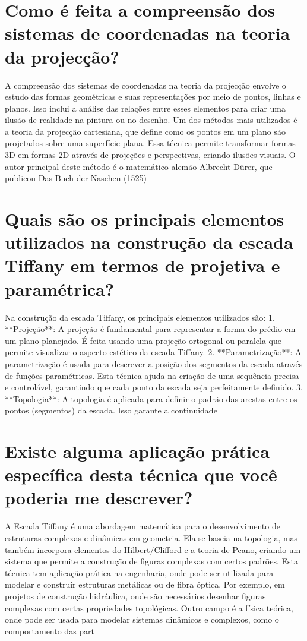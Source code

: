 \documentclass[11pt,a4paper]{article}
\begin{document}
\section{Como é feita a compreensão dos sistemas de coordenadas na teoria da projecção?}
A compreensão dos sistemas de coordenadas na teoria da projecção envolve o estudo das formas geométricas e suas representações por meio de pontos, linhas e planos. Isso inclui a análise das relações entre esses elementos para criar uma ilusão de realidade na pintura ou no desenho. Um dos métodos mais utilizados é a teoria da projecção cartesiana, que define como os pontos em um plano são projetados sobre uma superfície plana. Essa técnica permite transformar formas 3D em formas 2D através de projeções e perspectivas, criando ilusões visuais. O autor principal deste método é o matemático alemão Albrecht Dürer, que publicou Das Buch der Naschen (1525)

\section{Quais são os principais elementos utilizados na construção da escada Tiffany em termos de projetiva e paramétrica?}
Na construção da escada Tiffany, os principais elementos utilizados são: 1. **Projeção**: A projeção é fundamental para representar a forma do prédio em um plano planejado. É feita usando uma projeção ortogonal ou paralela que permite visualizar o aspecto estético da escada Tiffany. 2. **Parametrização**: A parametrização é usada para descrever a posição dos segmentos da escada através de funções paramétricas. Esta técnica ajuda na criação de uma sequência precisa e controlável, garantindo que cada ponto da escada seja perfeitamente definido. 3. **Topologia**: A topologia é aplicada para definir o padrão das arestas entre os pontos (segmentos) da escada. Isso garante a continuidade

\section{Existe alguma aplicação prática específica desta técnica que você poderia me descrever?}
A Escada Tiffany é uma abordagem matemática para o desenvolvimento de estruturas complexas e dinâmicas em geometria. Ela se baseia na topologia, mas também incorpora elementos do Hilbert/Clifford e a teoria de Peano, criando um sistema que permite a construção de figuras complexas com certos padrões. Esta técnica tem aplicação prática na engenharia, onde pode ser utilizada para modelar e construir estruturas metálicas ou de fibra óptica. Por exemplo, em projetos de construção hidráulica, onde são necessários desenhar figuras complexas com certas propriedades topológicas. Outro campo é a física teórica, onde pode ser usada para modelar sistemas dinâmicos e complexos, como o comportamento das part
\end{document}
